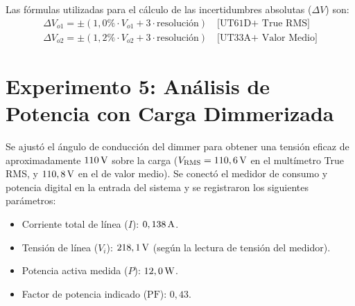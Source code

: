 \begin{table}[!ht]
    \centering
    \caption{Tensión eficaz de salida en función de la fase de retardo de disparo del Triac.}
    \label{tab.dimmer:tp4_exp4}
\end{table}

Las fórmulas utilizadas para el cálculo de las incertidumbres absolutas ($\Delta V$) son:
\begin{gather}
    \Delta V_{o1} = \pm (1,0\% \cdot V_{o1} + 3 \cdot \text{resolución}) \quad \text{[UT61D+ True RMS]} \\
    \Delta V_{o2} = \pm (1,2\% \cdot V_{o2} + 3 \cdot \text{resolución}) \quad \text{[UT33A+ Valor Medio]}
\end{gather}


\section{Experimento 5: Análisis de Potencia con Carga Dimmerizada}
Se ajustó el ángulo de conducción del dimmer para obtener una tensión eficaz de aproximadamente $110\,\mathrm{V}$ sobre la carga
($V_{\text{RMS}} = 110,6\,\mathrm{V}$ en el multímetro True RMS, y $110,8\,\mathrm{V}$ en el de valor medio). Se conectó el medidor de consumo y
potencia digital en la entrada del sistema y se registraron los siguientes parámetros:
\begin{itemize}
    \item Corriente total de línea ($I$): $0,138\,\mathrm{A}$.
    \item Tensión de línea ($V_i$): $218,1\,\mathrm{V}$ (según la lectura de tensión del medidor).
    \item Potencia activa medida ($P$): $12,0\,\mathrm{W}$.
    \item Factor de potencia indicado ($\text{PF}$): $0,43$.
\end{itemize}


